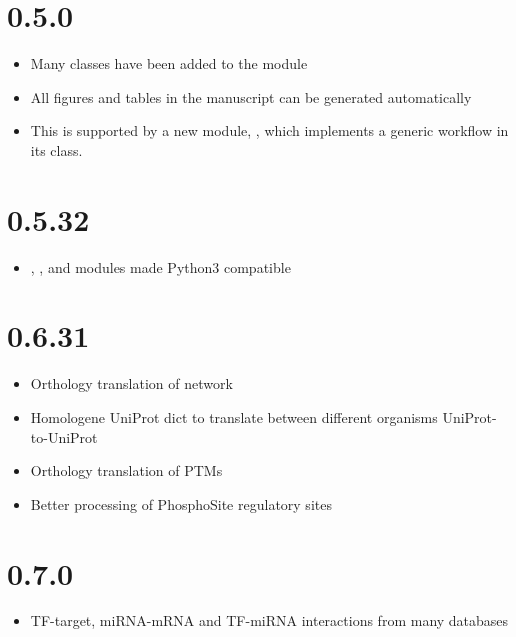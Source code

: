 \documentclass[letterpaper,10pt,english]{sphinxmanual}
\begin{document}
\section{0.5.0}
\label{\detokenize{index:id7}}\begin{itemize}
\item {} 
Many classes have been added to the  module

\item {} 
All figures and tables in the manuscript can be generated automatically

\item {} 
This is supported by a new module, , which implements a generic workflow in its  class.

\end{itemize}


\section{0.5.32}
\label{\detokenize{index:id8}}\begin{itemize}
\item {} 
, ,  and  modules made Python3 compatible

\end{itemize}


\section{0.6.31}
\label{\detokenize{index:id9}}\begin{itemize}
\item {} 
Orthology translation of network

\item {} 
Homologene UniProt dict to translate between different organisms UniProt-to-UniProt

\item {} 
Orthology translation of PTMs

\item {} 
Better processing of PhosphoSite regulatory sites

\end{itemize}


\section{0.7.0}
\label{\detokenize{index:id10}}\begin{itemize}
\item {} 
TF-target, miRNA-mRNA and TF-miRNA interactions from many databases

\end{itemize}
\end{document}
